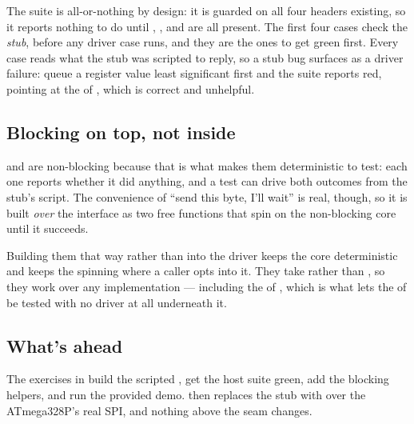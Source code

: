 The suite is all-or-nothing by design: it is guarded on all four headers existing, so it reports
nothing to do until , ,  and 
are all present. The first four cases check the \emph{stub}, before any driver case runs, and they
are the ones to get green first. Every  case reads what the stub was scripted to reply, so
a stub bug surfaces as a driver failure: queue a register value least significant first and the
suite reports  red, pointing at the  of
, which is correct and unhelpful.

\subsection{Blocking on top, not inside}
\label{c8:sec:blocking}
 and  are non-blocking because that is what makes them deterministic to
test: each one reports whether it did anything, and a test can drive both outcomes from the stub's
script. The convenience of ``send this byte, I'll wait'' is real, though, so it is built \emph{over}
the interface as two free functions that spin on the non-blocking core until it succeeds.

Building them that way rather than into the driver keeps the core deterministic and keeps the
spinning where a caller opts into it. They take  rather than , so they
work over any implementation --- including the  of , which is
what lets the  of  be tested with no driver at all underneath it.

\subsection{What's ahead}
The exercises in  build the scripted , get the host suite green,
add the blocking helpers, and run the provided demo.  then replaces the stub with
 over the ATmega328P's real SPI, and nothing above the seam changes.
